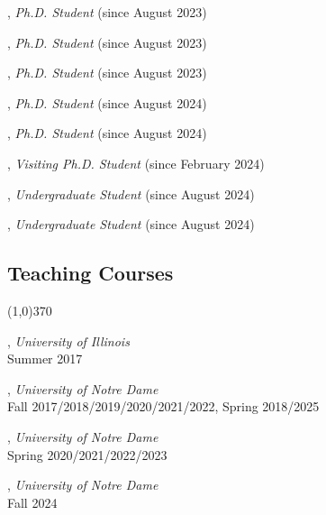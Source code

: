 \documentclass[10pt]{article}
\newenvironment{myindentpar}[1]%
{\begin{list}{}%
         {\setlength{\leftmargin}{#1}}%
         \item[]%
}
{\end{list}}
\newcounter{list}
\begin{document}
\begin{myindentpar}{0.75cm}
\hspace{-0.75cm}{\bf Mengzhao Jia}, \textit{Ph.D. Student} (since August 2023)

\hspace{-0.75cm}{\bf Zheyuan (Frank) Liu}, \textit{Ph.D. Student} (since August 2023)

\hspace{-0.75cm}{\bf Zhaoxuan Tan}, \textit{Ph.D. Student} (since August 2023)

\hspace{-0.75cm}{\bf Yining Lu}, \textit{Ph.D. Student} (since August 2024)

\hspace{-0.75cm}{\bf Yihan Zhu}, \textit{Ph.D. Student} (since August 2024)

\hspace{-0.75cm}{\bf Zhenyu Wu}, \textit{Visiting Ph.D. Student} (since February 2024)

\hspace{-0.75cm}{\bf Olivia Zino}, \textit{Undergraduate Student} (since August 2024)

\hspace{-0.75cm}{\bf Lang Li}, \textit{Undergraduate Student} (since August 2024)

\end{myindentpar}

\subsection{\sc Teaching Courses}
\vspace{-0.4cm} \line(1,0){370} \vspace{-0.1cm}

\begin{myindentpar}{0.75cm}

\hspace{-0.75cm}{\bf CS 412 Introduction to Data Mining}, \textit{University of Illinois} \\
	Summer 2017
	
\hspace{-0.75cm}{\bf CSE 40647/60647 Data Science}, \textit{University of Notre Dame}  \\
	Fall 2017/2018/2019/2020/2021/2022, Spring 2018/2025

\hspace{-0.75cm}{\bf CSE 60326 Computational Behavior Modeling}, \textit{University of Notre Dame} \\
	Spring 2020/2021/2022/2023

\hspace{-0.75cm}{\bf CSE 60556 Large Language Models}, \textit{University of Notre Dame} \\
	Fall 2024

\end{myindentpar}
\end{document}

